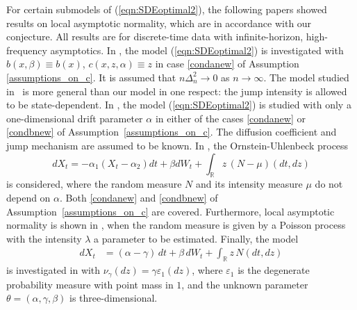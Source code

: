 \documentclass[11pt,a4paper]{article}
\newcommand{\RR}{{\mathbb R}}
\numberwithin{equation}{section}
\numberwithin{theorem}{section}
\begin{document}
For certain submodels of (\ref{eqn:SDEoptimal2}), the following papers showed results on local asymptotic normality, which are in accordance with our conjecture. All results are for discrete-time data with infinite-horizon, high-frequency asymptotics. In \cite[Propositions 1 \& 2]{becheri2016}, the model (\ref{eqn:SDEoptimal2}) is investigated with $b(x, \beta) \equiv b(x)$, $c(x,z,\alpha) \equiv z$ in case \ref{condanew} of Assumption \ref{assumptions_on_c}. It is assumed that  $n\Delta_n^2 \to 0$ as $n\to \infty$. The model studied in \cite{becheri2016}\ is more general than our model in one respect: the jump intensity is allowed to be state-dependent. In \cite[Theorem 2.2]{kohatsuhiga2017}, the model (\ref{eqn:SDEoptimal2}) is studied with only a one-dimensional drift parameter $\alpha$ in either of the cases \ref{condanew} or \ref{condbnew} of Assumption~\ref{assumptions_on_c}. The diffusion coefficient and jump mechanism are assumed to be known. In \cite{kawai2013-2}, the Ornstein-Uhlenbeck process
\[
dX_t = -\alpha_1(X_t - \alpha_2)dt + \beta dW_t + \int_\RR z \, (N - \mu)(dt,dz)
\]
is considered, where the random measure $N$ and its intensity measure $\mu$ do not depend on $\alpha$. Both \ref{condanew} and \ref{condbnew} of Assumption~\ref{assumptions_on_c} are covered. Furthermore, local asymptotic normality is shown in \cite{tran2017}, when the random measure is given by a Poisson process with the intensity $\lambda$ a parameter to be estimated. Finally, the model 
\begin{align*}
dX_t &= (\alpha -\gamma)\, dt + \beta\, dW_t + \int_\RR z \, N(dt,dz)
\end{align*}
is investigated in \cite{kohatsuhiga2014} with $\nu_\gamma(dz) = \gamma \varepsilon_1(dz)$, where $\varepsilon_1$ is the degenerate probability measure with point mass in $1$, and the unknown parameter $\theta = (\alpha,\gamma,\beta)$ is three-dimensional.
\end{document}
